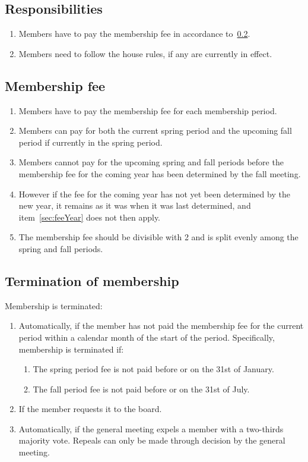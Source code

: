 \subsection{Responsibilities}
\begin{enumerate}
  \item Members have to pay the membership fee in accordance to~\ref{sec:membershipFee}.
  \item Members need to follow the house rules, if any are currently in effect.
\end{enumerate}

\subsection{Membership fee} \label{sec:membershipFee}
\begin{enumerate}
  \item Members have to pay the membership fee for each membership period.
  \item Members can pay for both the current spring period and the upcoming fall period if currently in the spring period.
  \item Members cannot pay for the upcoming spring and fall periods before the membership fee for the coming year has been determined by the fall meeting. \label{sec:feeYear}
  \item However if the fee for the coming year has not yet been determined by the new year, it remains as it was when it was last determined, and item~\ref{sec:feeYear} does not then apply.
  \item The membership fee should be divisible with 2 and is split evenly among the spring and fall periods.
\end{enumerate}

\subsection{Termination of membership} \label{sec:membershipTermination}
Membership is terminated:
\begin{enumerate}
  \item Automatically, if the member has not paid the membership fee for the current period within a calendar month of the start of the period. Specifically, membership is terminated if:
  \begin{enumerate}
    \item The spring period fee is not paid before or on the 31st of January.
    \item The fall period fee is not paid before or on the 31st of July.
  \end{enumerate}
  \item If the member requests it to the board.
  \item Automatically, if the general meeting expels a member with a two-thirds majority vote. Repeals can only be made through decision by the general meeting.
\end{enumerate}


